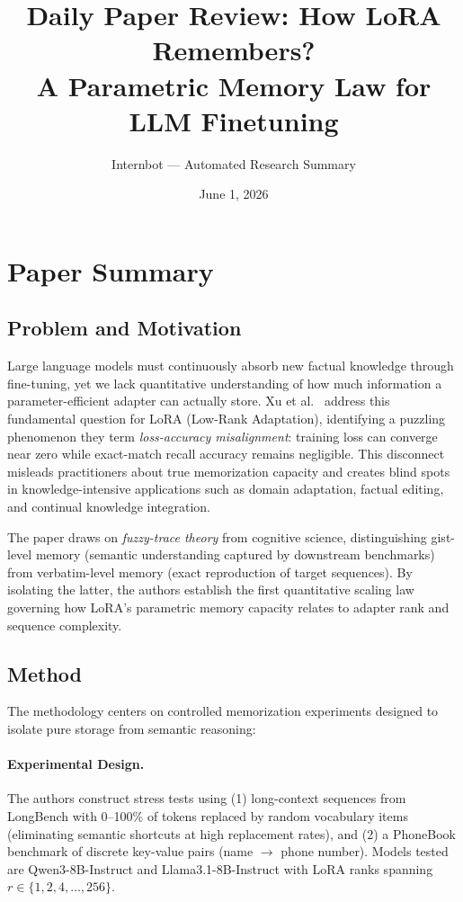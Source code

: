 \documentclass[11pt,a4paper]{article}
\title{Daily Paper Review: How LoRA Remembers?\\A Parametric Memory Law for LLM Finetuning}
\author{Internbot --- Automated Research Summary}
\date{June 1, 2026}
\begin{document}
\maketitle

\section{Paper Summary}

\subsection{Problem and Motivation}

Large language models must continuously absorb new factual knowledge through fine-tuning, yet we lack quantitative understanding of how much information a parameter-efficient adapter can actually store. Xu et al.~\cite{xu2026lora} address this fundamental question for LoRA (Low-Rank Adaptation), identifying a puzzling phenomenon they term \emph{loss-accuracy misalignment}: training loss can converge near zero while exact-match recall accuracy remains negligible. This disconnect misleads practitioners about true memorization capacity and creates blind spots in knowledge-intensive applications such as domain adaptation, factual editing, and continual knowledge integration.

The paper draws on \emph{fuzzy-trace theory} from cognitive science, distinguishing gist-level memory (semantic understanding captured by downstream benchmarks) from verbatim-level memory (exact reproduction of target sequences). By isolating the latter, the authors establish the first quantitative scaling law governing how LoRA's parametric memory capacity relates to adapter rank and sequence complexity.

\subsection{Method}

The methodology centers on controlled memorization experiments designed to isolate pure storage from semantic reasoning:

\paragraph{Experimental Design.} The authors construct stress tests using (1) long-context sequences from LongBench with 0--100\% of tokens replaced by random vocabulary items (eliminating semantic shortcuts at high replacement rates), and (2) a PhoneBook benchmark of discrete key-value pairs (name $\to$ phone number). Models tested are Qwen3-8B-Instruct and Llama3.1-8B-Instruct with LoRA ranks spanning $r \in \{1, 2, 4, \ldots, 256\}$.
\end{document}
